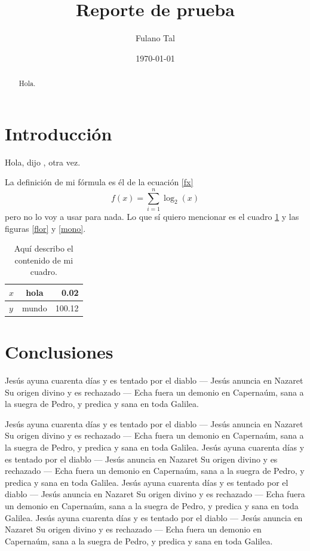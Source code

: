 \documentclass{article}
\author{Fulano Tal}
\title{Reporte de prueba}
\date{\today}
\begin{document}
\maketitle

\begin{abstract}

Hola.

\end{abstract}

\section{Introducción}

Hola, dijo \citet{lol}, otra vez. 

La definición de mi fórmula es él de la ecuación \eqref{fx}
\begin{equation}
f(x) = \sum_{i = 1}^n \log_2(x)
\label{fx}
\end{equation}
pero no lo voy a usar para nada. Lo que sí quiero mencionar es el cuadro \ref{esto} y las figuras \ref{flor} y \ref{mono}.

\begin{table}
\caption{Aquí describo el contenido de mi cuadro.}
\label{esto}
\vspace*{3mm}
\centering
\begin{tabular}{lc|r|}
$x$ & hola & 0.02 \\
\hline
$y$ & mundo & 100.12
\end{tabular}
\end{table}

\section{Conclusiones}

Jesús \citep{lol} ayuna cuarenta días y es tentado por el diablo --- Jesús anuncia en Nazaret Su origen divino y es rechazado --- Echa fuera un demonio en Capernaúm, sana a la suegra de Pedro, y predica y sana en toda Galilea.

Jesús ayuna cuarenta días y es tentado por el diablo --- Jesús anuncia en Nazaret Su origen divino y es rechazado --- Echa fuera un demonio en Capernaúm, sana a la suegra de Pedro, y predica y sana en toda Galilea.
Jesús ayuna cuarenta días y es tentado por el diablo --- Jesús anuncia en Nazaret Su origen divino y es rechazado --- Echa fuera un demonio en Capernaúm, sana a la suegra de Pedro, y predica y sana en toda Galilea.
Jesús ayuna cuarenta días y es tentado por el diablo --- Jesús anuncia en Nazaret Su origen divino y es rechazado --- Echa fuera un demonio en Capernaúm, sana a la suegra de Pedro, y predica y sana en toda Galilea.
Jesús ayuna cuarenta días y es tentado por el diablo --- Jesús anuncia en Nazaret Su origen divino y es rechazado --- Echa fuera un demonio en Capernaúm, sana a la suegra de Pedro, y predica y sana en toda Galilea.
\end{document}
